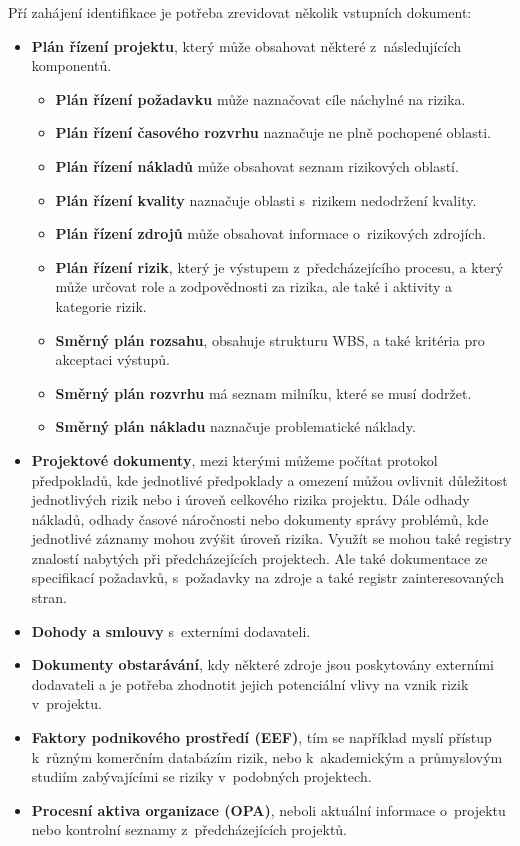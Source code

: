 Pří zahájení identifikace je potřeba zrevidovat několik vstupních dokument:
\begin{itemize}
    \item \textbf{Plán řízení projektu}, který může obsahovat některé z~následujících komponentů. 
    \begin{itemize}
        \item \textbf{Plán řízení požadavku} může naznačovat cíle náchylné na rizika.
        \item \textbf{Plán řízení časového rozvrhu} naznačuje ne plně pochopené oblasti.
        \item \textbf{Plán řízení nákladů} může obsahovat seznam rizikových oblastí.
        \item \textbf{Plán řízení kvality} naznačuje oblasti s~rizikem nedodržení kvality.
        \item \textbf{Plán řízení zdrojů} může obsahovat informace o~rizikových zdrojích.
        \item \textbf{Plán řízení rizik}, který je výstupem z~předcházejícího procesu, a který může určovat role a zodpovědnosti za rizika, ale také i aktivity a kategorie rizik.
        \item \textbf{Směrný plán rozsahu}, obsahuje strukturu WBS, a také kritéria pro akceptaci výstupů.
        \item \textbf{Směrný plán rozvrhu} má seznam milníku, které se musí dodržet. 
        \item \textbf{Směrný plán nákladu} naznačuje problematické náklady.
         
    \end{itemize}
     \item \textbf{Projektové dokumenty}, mezi kterými můžeme počítat protokol předpokladů, kde jednotlivé předpoklady a omezení můžou ovlivnit důležitost jednotlivých rizik nebo i úroveň celkového rizika projektu. Dále odhady nákladů, odhady časové náročnosti nebo dokumenty správy problémů, kde jednotlivé záznamy mohou zvýšit úroveň rizika. Využít se mohou také registry znalostí nabytých při předcházejících projektech. Ale také dokumentace ze specifikací požadavků, s~požadavky na zdroje a také registr zainteresovaných stran. 
    \item \textbf{Dohody a smlouvy} s~externími dodavateli.
    \item \textbf{Dokumenty obstarávání}, kdy některé zdroje jsou poskytovány externími dodavateli a je potřeba zhodnotit jejich potenciální vlivy na vznik rizik v~projektu.
    \item \textbf{Faktory podnikového prostředí (EEF)}, tím se například myslí přístup k~různým komerčním databázím rizik, nebo k~akademickým a průmyslovým studiím zabývajícími se riziky v~podobných projektech.
    \item \textbf{Procesní aktiva organizace (OPA)}, neboli aktuální informace o~projektu nebo kontrolní seznamy z~předcházejících projektů.
\end{itemize}

